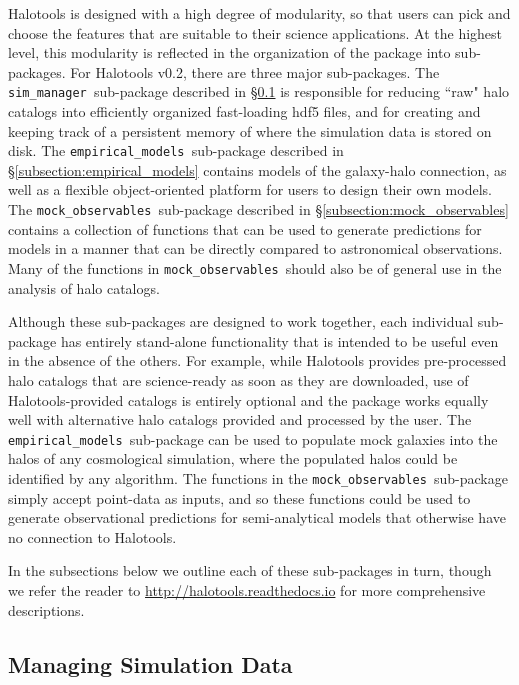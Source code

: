 \documentclass[twocolumn, tighten]{aastex6}
\newcommand{\mockobs}{{\tt mock\_observables }}
\newcommand{\emodels}{{\tt empirical\_models }}
\newcommand{\sims}{{\tt sim\_manager }}
\begin{document}
Halotools is designed with a high degree of modularity, so that users can pick and choose the features that are suitable to their science applications. At the highest level, this modularity is reflected in the organization of the package into sub-packages. For Halotools v0.2, there are three major sub-packages. The \sims sub-package described in \S\ref{subsection:sim_manager} is responsible for reducing ``raw" halo catalogs into efficiently organized fast-loading hdf5 files, and for creating and keeping track of a persistent memory of where the simulation data is stored on disk. The \emodels sub-package described in \S\ref{subsection:empirical_models} contains models of the galaxy-halo connection, as well as a flexible object-oriented platform for users to design their own models. The \mockobs sub-package described in \S\ref{subsection:mock_observables} contains a collection of functions that can be used to generate predictions for models in a manner that can be directly compared to astronomical observations. Many of the functions in \mockobs should also be of general use in the analysis of halo catalogs. 

Although these sub-packages are designed to work together, each individual sub-package has entirely stand-alone functionality that is intended to be useful even in the absence of the others. For example, while Halotools provides pre-processed halo catalogs that are science-ready as soon as they are downloaded, use of Halotools-provided catalogs is entirely optional and the package works equally well with alternative halo catalogs provided and processed by the user. The \emodels sub-package can be used to populate mock galaxies into the halos of any cosmological simulation, where the populated halos could be identified by any algorithm. The functions in the \mockobs sub-package simply accept point-data as inputs, and so these functions could be used to generate observational predictions for semi-analytical models that otherwise have no connection to Halotools. 

In the subsections below we outline each of these sub-packages in turn, though we refer the reader to \url{http://halotools.readthedocs.io} for more comprehensive descriptions. 

\subsection{Managing Simulation Data}
\label{subsection:sim_manager}
\end{document}

